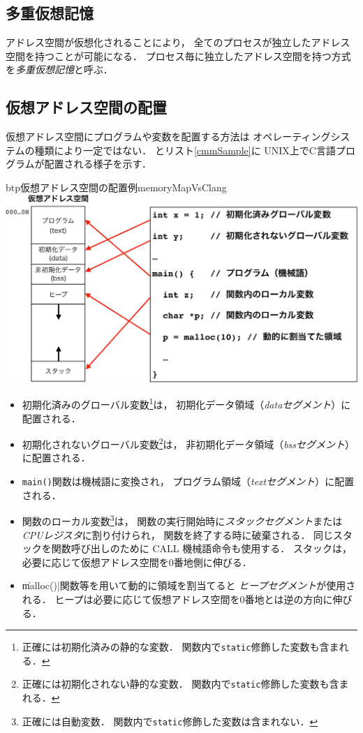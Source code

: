 \subsection{多重仮想記憶}
アドレス空間が仮想化されることにより，
全てのプロセスが独立したアドレス空間を持つことが可能になる．
プロセス毎に独立したアドレス空間を持つ方式を\emph{多重仮想記憶}と呼ぶ．

\subsection{仮想アドレス空間の配置}
仮想アドレス空間にプログラムや変数を配置する方法は
オペレーティングシステムの種類により一定ではない．
とリスト\ref{cmmSample}に
UNIX上でC言語プログラムが配置される様子を示す．

\begin{myfig}{btp}{仮想アドレス空間の配置例}{memoryMapVsClang}
  \includegraphics[scale=0.6]{Fig/memoryMapVsClang-crop.pdf}
\end{myfig}

\begin{itemize}
\item 初期化済みのグローバル変数\footnote{
  正確には初期化済みの静的な変数．
  関数内で\texttt{static}修飾した変数も含まれる．}は，
  初期化データ領域（\emph{dataセグメント}）に配置される．
\item 初期化されないグローバル変数\footnote{
  正確には初期化されない静的な変数．
  関数内で\texttt{static}修飾した変数も含まれる．}は，
  非初期化データ領域（\emph{bssセグメント}）に配置される．
\item \texttt{main()}関数は機械語に変換され，
  プログラム領域（\emph{textセグメント}）に配置される．
\item 関数のローカル変数\footnote{
  正確には自動変数．
  関数内で\texttt{static}修飾した変数は含まれない．}は，
  関数の実行開始時に\emph{スタックセグメント}または
  \emph{CPUレジスタ}に割り付けられ，
  関数を終了する時に破棄される．
  同じスタックを関数呼び出しのために CALL 機械語命令も使用する．
  スタックは，必要に応じて仮想アドレス空間を0番地側に伸びる．
\item \|malloc()|関数等を用いて動的に領域を割当てると
  \emph{ヒープセグメント}が使用される．
  ヒープは必要に応じて仮想アドレス空間を0番地とは逆の方向に伸びる．
\end{itemize}

